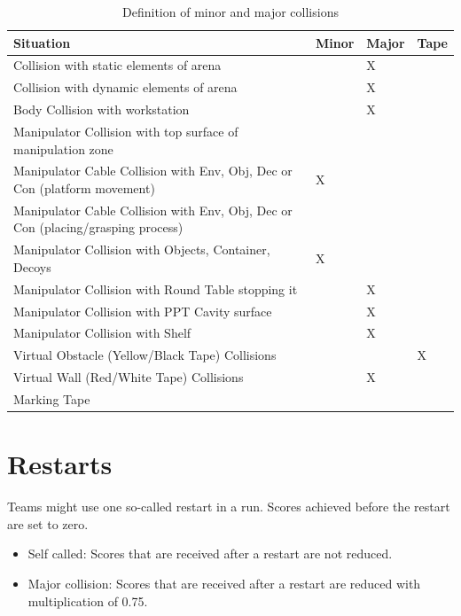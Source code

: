 \begin{table}[h!]
	\caption{Definition of minor and major collisions}
	\label{tab:collisions}
	\centering
	\begin{tabular}{|l|p{1cm}|p{1cm}|p{1.5cm}|}
		\hline
		Situation                                                & Minor & Major &  Tape \\
		\hline
		Collision with static elements of arena                  &       & X     &              \\
		Collision with dynamic elements of arena                 &       & X     &              \\
		Body Collision with workstation                    &       & X     &              \\
		Manipulator Collision with top surface of manipulation zone       &       &       &              \\
		Manipulator Cable Collision with Env, Obj, Dec or Con (platform movement)    &  X     &       &              \\
		Manipulator Cable Collision with Env, Obj, Dec or Con (placing/grasping process)    &       &       &              \\
		Manipulator Collision with Objects, Container, Decoys & X     &       &              \\
		Manipulator Collision with Round Table stopping it &      & X      &              \\
		Manipulator Collision with PPT Cavity surface      &      & X      &              \\
		Manipulator Collision with Shelf                   &      & X      &              \\
		Virtual Obstacle (Yellow/Black Tape) Collisions          &       &       & X            \\
		Virtual Wall (Red/White Tape) Collisions                 &       & X     &              \\
		Marking Tape & & & \\
		\hline
	\end{tabular}
\end{table}



\section{Restarts}
Teams might use one so-called restart in a run. Scores achieved before the restart are set to zero. 
\begin{itemize}
	\item Self called: Scores that are received after a restart are not reduced.
	\item Major collision: Scores that are received after a restart are reduced with multiplication of 0.75.
\end{itemize}

